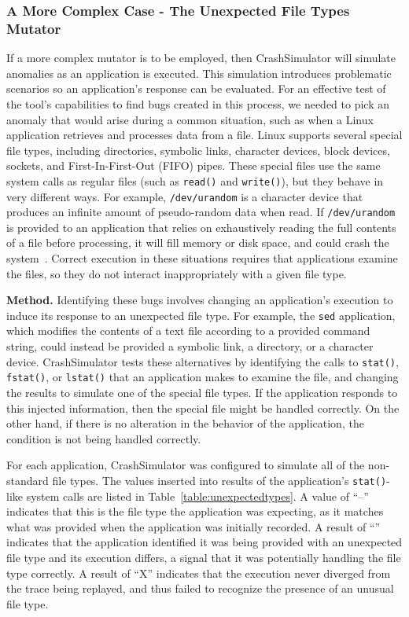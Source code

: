 \subsubsection{A More Complex Case - The Unexpected File Types Mutator}
\label{sec-file-type-bugs}

If a more complex mutator is to be employed, then
CrashSimulator will simulate anomalies as an application is executed.
This simulation introduces problematic scenarios
so an application's response
can be evaluated.
For an effective test of the
tool's capabilities to find bugs created in this process,
we needed to pick an anomaly
that would arise during a common situation,
such as when a Linux application retrieves
and processes data from a file.
Linux supports
several special file types,
including
directories,
symbolic links,
character devices,
block devices,
sockets, and
First-In-First-Out (FIFO) pipes.
These special files
use the same system calls
as regular files
(such as {\tt read()} and {\tt write()}),
but they behave in very different ways.
For example,
{\tt /dev/urandom} is a character device
that produces an infinite amount
of pseudo-random data
when read.
If {\tt /dev/urandom} is provided to an application
that relies on exhaustively reading the full
contents of a file before processing, it
will fill memory or disk space, and could
crash the system~\cite{YumAptEndless}.
Correct execution in these situations
requires that applications
examine the files, so they do not
interact inappropriately with a given file type.

{\bf Method.}
Identifying these bugs involves changing an application's
execution to induce its response to an unexpected file type. For
example, the {\tt sed} application, which modifies the contents of a text
file according to a provided command string, could instead be provided a symbolic
link, a directory, or a character device.  CrashSimulator
tests these alternatives by identifying the calls to {\tt stat()}, {\tt fstat()},
or {\tt lstat()} that an application makes to examine the file, and
changing the results to simulate
one of the special file types.  If the application responds to
this injected information, then the special
file might be handled correctly.  On the other hand, if there is no
alteration in the behavior of the application, the condition is not
being handled correctly.

For each application,
CrashSimulator was configured to simulate all of the non-standard file
types.
The values inserted into results of the application's {\tt stat()}-like
system calls are listed
in Table~\ref{table:unexpectedtypes}.
A value of ``--'' indicates
that this is the file type the application was expecting,
as it matches what was provided when the application was initially recorded.
A result of ``\tickmark'' indicates that the application
identified it was being provided with an unexpected file type and its
execution differs, a signal that it was potentially handling the
file type correctly.
A result of ``X'' indicates
that the execution never diverged from the trace being replayed,
and thus failed to recognize the presence of an unusual file type.


